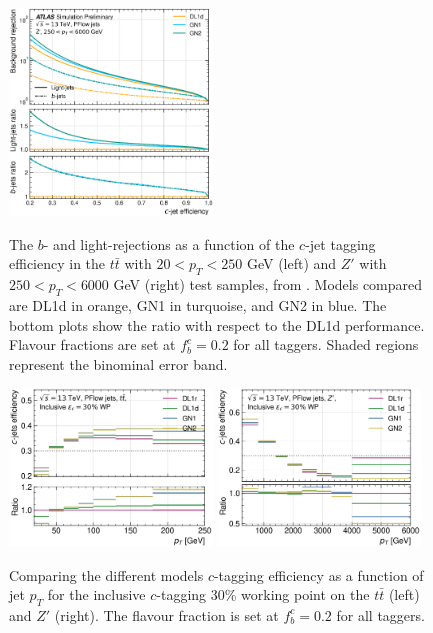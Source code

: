 \begin{center}
\begin{figure}[h!]
{  \includegraphics[width=0.48\textwidth]{Images/FTAG/GN/GN2/ROCpublic/zpc.png}
  }
  \caption{The $b$- and light-rejections as a function of the $c$-jet tagging efficiency in the $t\bar{t}$ with $20 < p_T < 250$ GeV (left) and $Z'$ with $250 < p_T < 6000$ GeV (right) test samples, from \cite{ATL-PLOT-FTAG-2023-01}. Models compared are DL1d in orange, GN1 in turquoise, and GN2 in blue. The bottom plots show the ratio with respect to the DL1d performance. Flavour fractions are set at $f^c_b = 0.2$ for all taggers. Shaded regions represent the binominal error band.}
  \label{apfig:GN2rocc}
  \end{figure}
\end{center}

\begin{figure}[h!]
    \centering
    \includegraphics[width=0.48\textwidth]{Images/FTAG/GN/GN2/pt_plots/pt_ttbar_c_eff.png}
    \includegraphics[width=0.48\textwidth]{Images/FTAG/GN/GN2/pt_plots/pt_zp_c_eff.png}
    \caption{Comparing the different models $c$-tagging efficiency as a function of jet $p_T$ for the inclusive $c$-tagging 30\% working point on the $t\bar{t}$ (left) and $Z'$ (right). The flavour fraction is set at $f^c_b = 0.2$ for all taggers.}
    \label{apfig:GNxptc_eff}
\end{figure} 


